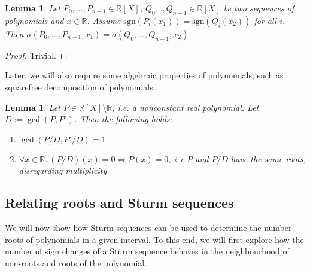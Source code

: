 \documentclass[11pt,a4paper,oneside]{article}
\newtheorem{lemma}[definition]{Lemma}
\newcommand{\RR}{\mathbb{R}}
\newcommand{\sgn}{\mathrm{sgn}}
\newcommand{\ie}{i.\,e.\xspace}
\begin{document}
\begin{lemma}\label{thm:same_signs}
Let $P_0,\ldots,P_{n-1}\in\RR[X]$, $Q_0\ldots,Q_{n-1}\in\RR[X]$ be two sequences of polynomials and $x\in\RR$. Assume $\sgn(P_i(x_1))=\sgn(Q_i(x_2))$ for all $i$. Then $\sigma(P_0,\ldots,P_{n-1};x_1)=\sigma(Q_0,\ldots,Q_{n-1};x_2)$.
\end{lemma}
\begin{proof}
Trivial.
\end{proof}\vskip3mm

Later, we will also require some algebraic properties of polynomials, such as squarefree decomposition of polynomials:
\begin{lemma}\label{thm:squarefree}
Let $P \in \RR[X]\setminus \RR$, i.e. a nonconstant real polynomial. Let $D:=\gcd(P,P')$. Then the following holds:
\begin{enumerate}
\item $\gcd(P/D, P'/D) = 1$
\item $\forall x\in\RR.\ (P/D)(x)=0 \Longleftrightarrow P(x)=0$, \ie $P$ and $P/D$ have the same roots, disregarding multiplicity
\end{enumerate}
\end{lemma}\vskip3mm


\subsection{Relating roots and Sturm sequences}
\label{sec:roots_sturm}

We will now show how Sturm sequences can be used to determine the number roots of polynomials in a given interval. To this end, we will first explore how the number of sign changes of a Sturm sequence behaves in the neighbourhood of non-roots and roots of the polynomial.\\
\end{document}
